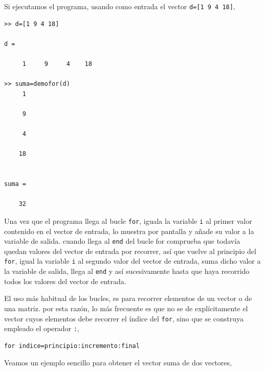 Si ejecutamos el programa, usando como entrada el vector \texttt{d=[1 9 4 18]},

\begin{verbatim}
>> d=[1 9 4 18]

d =

     1     9     4    18

>> suma=demofor(d)
     1

     9

     4

    18


suma =

    32
\end{verbatim}

Una vez que el programa llega al bucle \texttt{for}, iguala la variable \texttt{i} al primer valor contenido en el vector de entrada, lo muestra por pantalla y añade su valor a la variable de salida. cuando llega al \texttt{end} del bucle for comprueba que todavía quedan valores del vector de entrada por recorrer, así que vuelve al principio del \texttt{for}, igual la variable \texttt{i} al segundo valor del vector de entrada, suma dicho valor a la variable de salida, llega al \texttt{end} y así sucesivamente hasta que haya recorrido todos los valores del vector de entrada.

El uso más habitual de los bucles, es para recorrer elementos de un vector o de una matriz. por esta razón, lo más frecuente es que no se de explícitamente el vector cuyos elementos debe recorrer el índice del \texttt{for}, sino que se construya empleado el operador \texttt{:},
\begin{verbatim}
for indice=principio:incremento:final
\end{verbatim}

Veamos un ejemplo sencillo para obtener el vector suma de dos vectores,


